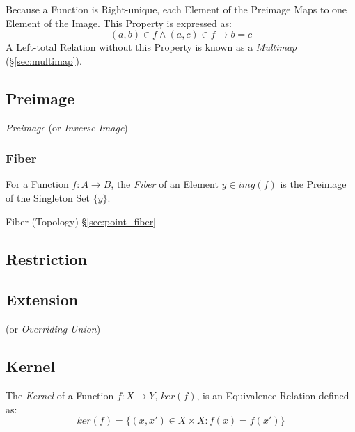 Because a Function is Right-unique, each Element of the Preimage Maps
to one Element of the Image. This Property is expressed as:
\[
  (a,b) \in f \wedge (a,c) \in f \rightarrow b = c
\]
A Left-total Relation without this Property is known as a
\emph{Multimap} (\S\ref{sec:multimap}).



\subsection{Preimage}\label{sec:preimage}

\emph{Preimage} (or \emph{Inverse Image})



\subsubsection{Fiber}\label{sec:fiber}

For a Function $f : A \rightarrow B$, the \emph{Fiber} of an Element
$y \in img(f)$ is the Preimage of the Singleton Set $\{y\}$.

Fiber (Topology) \S\ref{sec:point_fiber}



\subsection{Restriction}\label{sec:restriction}

\subsection{Extension}\label{sec:function_extension}

(or \emph{Overriding Union})



\subsection{Kernel}\label{sec:kernel}

The \emph{Kernel} of a Function $f : X \rightarrow Y$, $ker(f)$, is an
Equivalence Relation defined as:
\[
  ker(f) = \{ (x,x') \in X \times X : f(x) = f(x') \}
\]



